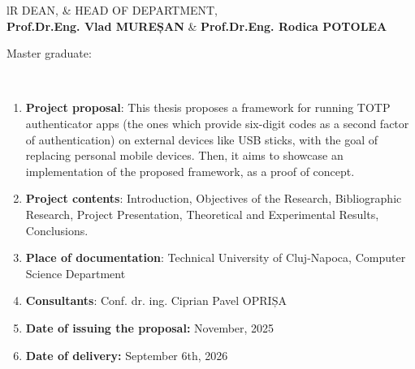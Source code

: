 \begin{titlepage}
\vspace*{-2cm}
\utcnlogo
\begin{center}
\department

\vspace{1cm}

%
\begin{tabularx}{\textwidth}{lR}
DEAN, & HEAD OF DEPARTMENT, \\
\textbf{Prof.Dr.Eng. Vlad MUREȘAN} & \textbf{Prof.Dr.Eng. Rodica POTOLEA}\\
\end{tabularx}

\vspace {2.5cm}

Master graduate:  \textbf\thesisauthor
\vspace{1cm}

\large \textbf\thesistitle \\
\vspace {1cm}

\end{center}


\begin{flushleft}
\begin{enumerate}
\item \textbf{Project proposal}:
  This thesis proposes a framework for running TOTP authenticator apps (the ones which provide six-digit codes as a second factor of authentication) on external devices like USB sticks, with the goal of replacing personal mobile devices.
  Then, it aims to showcase an implementation of the proposed framework, as a proof of concept.

 \item \textbf{Project contents}:
  Introduction, Objectives of the Research, Bibliographic Research, Project Presentation, Theoretical and Experimental Results, Conclusions.

 \item \textbf{Place of documentation}:
  Technical University of Cluj-Napoca, Computer Science Department

 \item \textbf{Consultants}:
 Conf. dr. ing. Ciprian Pavel OPRIȘA

 \item \textbf{Date of issuing the proposal:} November, 2025

 \item \textbf{Date of delivery:} September 6th, 2026
\end{enumerate}


\end{flushleft}
\end{titlepage}
